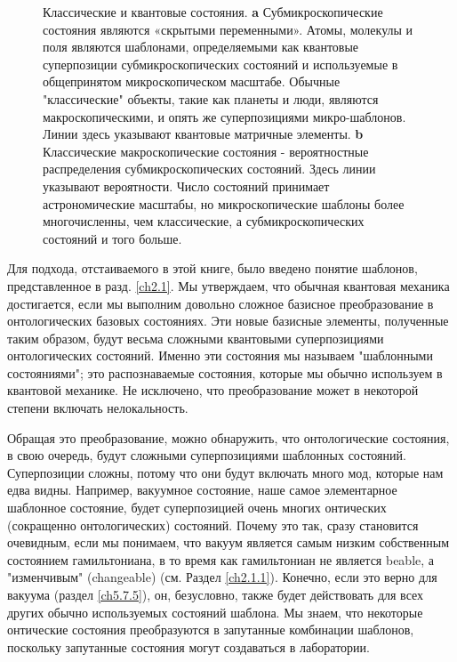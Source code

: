\documentclass[main.tex]{subfiles}
\begin{document}
\begin{figure}[ht] %
	\begin{center}
		\caption{
		\label{i4.1}
		Классические и квантовые состояния. \textbf{a} Субмикроскопические состояния являются «скрытыми переменными». Атомы, молекулы и поля являются шаблонами, определяемыми как квантовые суперпозиции субмикроскопических состояний и используемые в общепринятом микроскопическом масштабе. Обычные "классические" объекты, такие как планеты и люди, являются макроскопическими, и опять же суперпозициями микро-шаблонов. Линии здесь указывают квантовые матричные элементы.  \textbf{b} Классические макроскопические состояния - вероятностные распределения субмикроскопических состояний. Здесь линии указывают вероятности. Число состояний принимает астрономические масштабы, но микроскопические шаблоны более многочисленны, чем классические, а субмикроскопических состояний и того больше.}
	\end {center}
\end {figure}

Для подхода, отстаиваемого в этой книге, было введено понятие шаблонов, представленное в разд. \ref{ch2.1}. Мы утверждаем, что обычная квантовая механика достигается, если мы выполним довольно сложное базисное преобразование в онтологических базовых состояниях. Эти новые базисные элементы, полученные таким образом, будут весьма сложными квантовыми суперпозициями онтологических состояний. Именно эти состояния мы называем "шаблонными состояниями"; это распознаваемые состояния, которые мы обычно используем в квантовой механике. Не исключено, что преобразование может в некоторой степени включать нелокальность.

Обращая это преобразование, можно обнаружить, что онтологические состояния, в свою очередь, будут сложными суперпозициями шаблонных состояний. Суперпозиции сложны, потому что они будут включать много мод, которые нам едва видны. Например, вакуумное состояние, наше самое элементарное шаблонное состояние, будет суперпозицией очень многих онтических (сокращенно онтологических) состояний. Почему это так, сразу становится очевидным, если мы понимаем, что вакуум является самым низким собственным состоянием гамильтониана, в то время как гамильтониан не является beable, а "изменчивым" (changeable) (см. Раздел \ref{ch2.1.1}). Конечно, если это верно для вакуума (раздел \ref{ch5.7.5}), он, безусловно, также будет действовать для всех других обычно используемых состояний шаблона. Мы знаем, что некоторые онтические состояния преобразуются в запутанные комбинации шаблонов, поскольку запутанные состояния могут создаваться в лаборатории.
\end{document}
